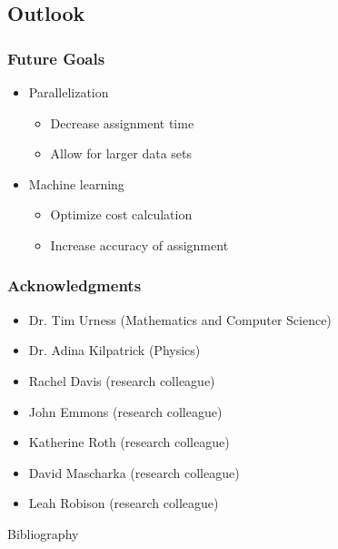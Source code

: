 \documentclass{beamer}
\begin{document}
\subsection{Outlook}
\begin{frame}
	\frametitle{Future Goals} 
	\begin{itemize}
		\item Parallelization
		\begin{itemize}
			\item Decrease assignment time
			\item Allow for larger data sets
		\end{itemize}
		\item Machine learning 
		\begin{itemize}
			\item Optimize cost calculation
			\item Increase accuracy of assignment
		\end{itemize}
	\end{itemize} 
\end{frame}

\begin{frame}
	\frametitle{Acknowledgments}
	\begin{itemize}
		\item Dr. Tim Urness (Mathematics and Computer Science)
		\item Dr. Adina Kilpatrick (Physics)
		\item Rachel Davis (research colleague)
		\item John Emmons (research colleague)
		\item  Katherine Roth (research colleague)
		\item  David Mascharka (research colleague)
		\item  Leah Robison (research colleague)
	\end{itemize}
\end{frame}

\begin{frame}{Bibliography}
\nocite{*}


\end{frame}
\end{document}
